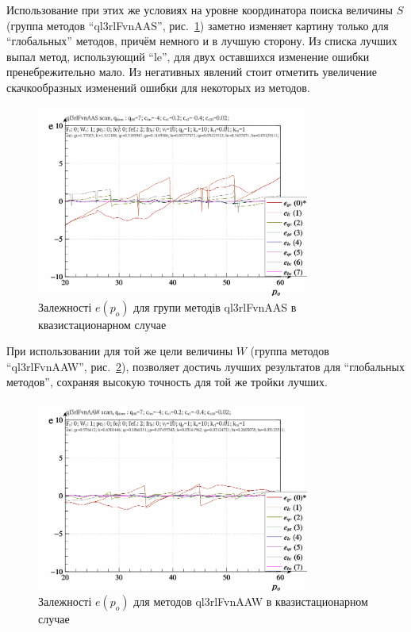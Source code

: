 Использование при этих же условиях на уровне координатора поиска
величины $S$ (группа методов ``ql3rlFvnAAS'', рис.~\ref{atu:f:ql3rlFvnAAS_scan}) заметно
изменяет картину только для ``глобальных'' методов,
причём немного и в лучшую сторону.
Из списка лучших выпал метод, использующий ``le'',
для двух оставшихся изменение ошибки пренебрежительно мало.
Из негативных явлений стоит отметить увеличение скачкообразных
изменений ошибки для некоторых из методов.

\begin{figure}[htb!]
  \begin{center}
    \includegraphics[width=0.8\textwidth]{p/scan/qls-p_p_e_ql3rlFvnAAS_scan.png}
  \end{center}
  \caption{Залежності $e(p_o)$ для групи методів ql3rlFvnAAS в квазистационарном случае}
  \label{atu:f:ql3rlFvnAAS_scan}
\end{figure}

При использовании для той же цели величины $W$
(группа методов ``ql3rlFvnAAW'', рис.~\ref{atu:f:ql3rlFvnAAW_scan}),
позволяет достичь лучших результатов для ``глобальных методов'',
сохраняя высокую точность для той же тройки лучших.


\begin{figure}[htb!]
  \begin{center}
    \includegraphics[width=0.8\textwidth]{p/scan/qls-p_p_e_ql3rlFvnAAW_scan.png}
  \end{center}
  \caption{Залежності $e(p_o)$ для методов ql3rlFvnAAW в квазистационарном случае}
  \label{atu:f:ql3rlFvnAAW_scan}
\end{figure}

